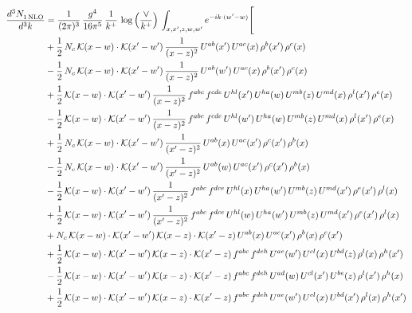\documentclass[9pt]{article}
\numberwithin{equation}{section}
\begin{document}
\begin{align}
    \frac{d^{3}N_{1\,\rm NLO}^{\rm}}{d^{3}k}  & = \frac{1}{(2\pi)^{3}}\,\frac{g^{4}}{16\pi^{5}}\,\frac{1}{k^{+}}\,\log{\left(\frac{\vee}{k^{+}}\right)}\, \int_{x,x',z,w,w'}e^{-ik\cdot(w'-w)}\Bigg[\notag\\ &+\frac{1}{2}\,N_{c}\,\mathcal{K}(x-w)\cdot\mathcal{K}(x'-w')\,\frac{1}{(x-z)^{2}}\,U^{ab}(x')\,U^{ac}(x)\,\rho^{b}(x')\,\rho^{c}(x)\notag \\ 
&-\frac{1}{2}\,N_{c}\,\mathcal{K}(x-w)\cdot\mathcal{K}(x'-w')\,\frac{1}{(x-z)^{2}}\,U^{ab}(w')\,U^{ac}(x)\,\rho^{b}(x')\,\rho^{c}(x)\notag \\ 
&+\frac{1}{2}\,\mathcal{K}(x-w)\cdot\mathcal{K}(x'-w')\,\frac{1}{(x-z)^{2}}\,f^{abc}\,f^{cde}\,U^{hl}(x')\,U^{ha}(w)\,U^{mb}(z)\,U^{md}(x)\,\rho^{l}(x')\,\rho^{e}(x)\notag \\ 
&-\frac{1}{2}\,\mathcal{K}(x-w)\cdot\mathcal{K}(x'-w')\,\frac{1}{(x-z)^{2}}\,f^{abc}\,f^{cde}\,U^{hl}(w')\,U^{ha}(w)\,U^{mb}(z)\,U^{md}(x)\,\rho^{l}(x')\,\rho^{e}(x)\notag \\ 
&+\frac{1}{2}\,N_{c}\,\mathcal{K}(x-w)\cdot\mathcal{K}(x'-w')\,\frac{1}{(x'-z)^{2}}\,U^{ab}(x)\,U^{ac}(x')\,\rho^{c}(x')\,\rho^{b}(x)\notag \\ 
&-\frac{1}{2}\,N_{c}\,\mathcal{K}(x-w)\cdot\mathcal{K}(x'-w')\,\frac{1}{(x'-z)^{2}}\,U^{ab}(w)\,U^{ac}(x')\,\rho^{c}(x')\,\rho^{b}(x)\notag \\ 
&-\frac{1}{2}\,\mathcal{K}(x-w)\cdot\mathcal{K}(x'-w')\,\frac{1}{(x'-z)^{2}}\,f^{abc}\,f^{dce}\,U^{hl}(x)\,U^{ha}(w')\,U^{mb}(z)\,U^{md}(x')\,\rho^{e}(x')\,\rho^{l}(x)\notag \\ 
&+\frac{1}{2}\,\mathcal{K}(x-w)\cdot\mathcal{K}(x'-w')\,\frac{1}{(x'-z)^{2}}\,f^{abc}\,f^{dce}\,U^{hl}(w)\,U^{ha}(w')\,U^{mb}(z)\,U^{md}(x')\,\rho^{e}(x')\,\rho^{l}(x)\notag \\ 
&+N_{c}\,\mathcal{K}(x-w)\cdot\mathcal{K}(x'-w')\,\mathcal{K}(x-z)\cdot\mathcal{K}(x'-z)\,U^{ab}(x)\,U^{ac}(x')\,\rho^{b}(x)\,\rho^{c}(x')\notag \\ 
&+\frac{1}{2}\,\mathcal{K}(x-w)\cdot\mathcal{K}(x'-w')\,\mathcal{K}(x-z)\cdot\mathcal{K}(x'-z)\,f^{abc}\,f^{deh}\,U^{ae}(w')\,U^{cl}(x)\,U^{bd}(z)\,\rho^{l}(x)\,\rho^{h}(x')\notag \\ 
&-\frac{1}{2}\,\mathcal{K}(x-w)\cdot\mathcal{K}(x'-w')\,\mathcal{K}(x-z)\cdot\mathcal{K}(x'-z)\,f^{abc}\,f^{deh}\,U^{ad}(w)\,U^{cl}(x')\,U^{be}(z)\,\rho^{l}(x')\,\rho^{h}(x)\notag \\ 
&+\frac{1}{2}\,\mathcal{K}(x-w)\cdot\mathcal{K}(x'-w')\,\mathcal{K}(x-z)\cdot\mathcal{K}(x'-z)\,f^{abc}\,f^{deh}\,U^{ae}(w')\,U^{cl}(x)\,U^{bd}(x')\,\rho^{l}(x)\,\rho^{h}(x')\notag \\ 

\end{align}
\end{document}
